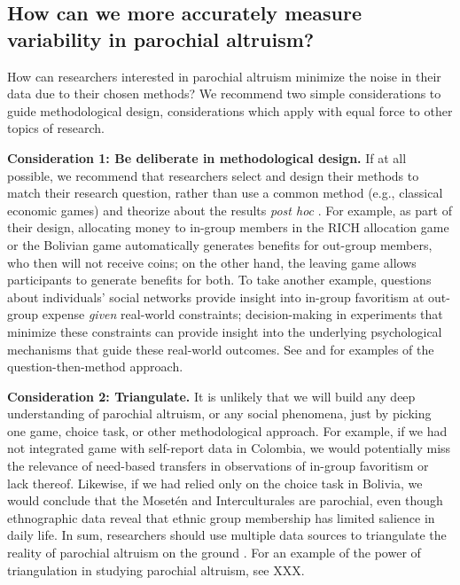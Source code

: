 \documentclass[bibauthoryear]{aa}
\begin{document}
\subsection{How can we more accurately measure variability in parochial altruism?}

How can researchers interested in parochial altruism minimize the noise in their data due to their chosen methods? We recommend two simple considerations to guide methodological design, considerations which apply with equal force to other topics of research.

\textbf{Consideration 1: Be deliberate in methodological design.} If at all possible, we recommend that researchers select and design their methods to match their research question, rather than use a common method (e.g., classical economic games) and theorize about the results \emph{post hoc} \citep{Pisor2020}. For example, as part of their design, allocating money to in-group members in the RICH allocation game or the Bolivian game automatically generates benefits for out-group members, who then will not receive coins; on the other hand, the leaving game allows participants to generate benefits for both. To take another example, questions about individuals' social networks provide insight into in-group favoritism at out-group expense \emph{given} real-world constraints; decision-making in experiments that minimize these constraints can provide insight into the underlying psychological mechanisms that guide these real-world outcomes. See \citet{schaub2017threat} and \citet{yamagishi2016parochial} for examples of the question-then-method approach.

\textbf{Consideration 2: Triangulate.} It is unlikely that we will build any deep understanding of parochial altruism, or any social phenomena, just by picking one game, choice task, or other methodological approach. For example, if we had not integrated game with self-report data in Colombia, we would potentially miss the relevance of need-based transfers in observations of in-group favoritism or lack thereof. Likewise, if we had relied only on the choice task in Bolivia, we would conclude that the Moset\'en and Interculturales are parochial, even though ethnographic data reveal that ethnic group membership has limited salience in daily life. In sum, researchers should use multiple data sources to triangulate the reality of parochial altruism on the ground \citep{Friedman2004, Pisor2020, Naar2020, gurven2008collective}. For an example of the power of triangulation in studying parochial altruism, see XXX.
\end{document}
